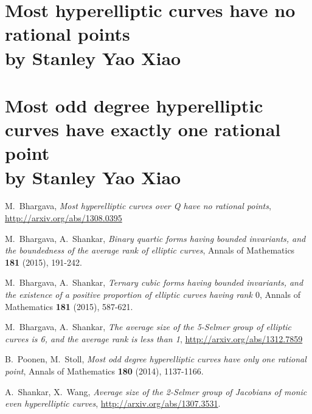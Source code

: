 \documentclass[12pt,amsfont]{amsart}
\begin{document}
\newpage
\section{Most hyperelliptic curves have no rational points \\ by Stanley Yao Xiao}

\newpage
\section{Most odd degree hyperelliptic curves have exactly one rational point \\ by Stanley Yao Xiao}


\newpage

\begin{thebibliography}{10}

M.~Bhargava, \emph{Most hyperelliptic curves over Q have no rational points}, \url{http://arxiv.org/abs/1308.0395}

M.~Bhargava, A.~Shankar, \emph{Binary quartic forms having bounded invariants, and the boundedness of the average rank of elliptic curves}, Annals of Mathematics \textbf{181} (2015), 191-242. 

M.~Bhargava, A.~Shankar, \emph{Ternary cubic forms having bounded invariants, and the existence of a positive proportion of elliptic curves having rank $0$}, Annals of Mathematics \textbf{181} (2015), 587-621. 

M.~Bhargava, A.~Shankar, \emph{The average size of the 5-Selmer group of elliptic curves is 6, and the average rank is less than 1}, \url{http://arxiv.org/abs/1312.7859}

B.~Poonen, M.~Stoll, \emph{Most odd degree hyperelliptic curves have only one rational point}, Annals of Mathematics \textbf{180} (2014), 1137-1166. 

A.~Shankar, X.~Wang, \emph{Average size of the 2-Selmer group of Jacobians of monic even hyperelliptic curves}, \url{http://arxiv.org/abs/1307.3531}. 

\end{thebibliography}
\end{document}
